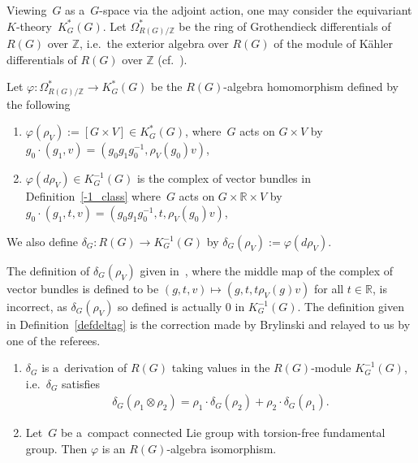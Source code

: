 Viewing~$G$ as a~$G$-space via the adjoint action, one may consider the equivariant $K$-theo\-ry~$K_G^*(G)$.
Let $\Omega^*_{R(G)/\mathbb{Z}}$ be the ring of Grothendieck dif\/ferentials of $R(G)$ over $\mathbb{Z}$, i.e.\
the exterior algebra over $R(G)$ of the module of K\"ahler dif\/ferentials of $R(G)$ over $\mathbb{Z}$ (cf.~\cite{BZ}).
\begin{Definition}
\label{defdeltag}
Let $\varphi: \Omega_{R(G)/\mathbb{Z}}^*\to K_G^*(G)$ be the $R(G)$-algebra homomorphism def\/ined by the following
\begin{enumerate}\itemsep=0pt
\item[1)]
$\varphi(\rho_V):=[G\times V]\in K_G^*(G)$, where~$G$ acts on $G\times V$ by $g_0\cdot(g_1, v)=(g_0g_1g_0^{-1},
\rho_V(g_0)v)$,
\item[2)]
$\varphi(d\rho_V)\in K_G^{-1}(G)$ is the complex of vector bundles in Def\/inition~\ref{-1_class} where~$G$ acts on
$G\times \mathbb{R}\times V$ by $g_0\cdot(g_1, t, v)=(g_0g_1g_0^{-1}, t, \rho_V(g_0)v)$,
\end{enumerate}
We also def\/ine $\delta_G: R(G)\to K^{-1}_G (G)$ by $\delta_G(\rho_V):=\varphi(d\rho_V)$.
\end{Definition}
\begin{Remark}
The def\/inition of $\delta_G(\rho_V)$ given in~\cite{BZ}, where the middle map of the complex of vector bundles is
def\/ined to be $(g, t, v)\mapsto(g, t, t\rho_V(g)v)$ for all $t\in\mathbb{R}$, is incorrect, as $\delta_G(\rho_V)$ so
def\/ined is actually 0 in $K_G^{-1}(G)$.
The def\/inition given in Def\/inition~\ref{defdeltag} is the correction made by Brylinski and relayed to us by one of the
referees.
\end{Remark}
\begin{Theorem}[\cite{BZ}]\label{eqderivation}\quad
\begin{enumerate}\itemsep=0pt
\item[$1.$]
$\delta_G$ is a~derivation of $R(G)$ taking values in the $R(G)$-module $K^{-1}_G(G)$, i.e.\
$\delta_G$ satisfies
\begin{gather}
\label{eqleibniz}
\delta_G(\rho_1\otimes\rho_2)=\rho_1\cdot\delta_G(\rho_2)+\rho_2\cdot\delta_G(\rho_1).
\end{gather}
\item[$2.$]
Let~$G$ be a~compact connected Lie group with torsion-free fundamental group.
Then $\varphi$ is an $R(G)$-algebra isomorphism.
\end{enumerate}
\end{Theorem}

